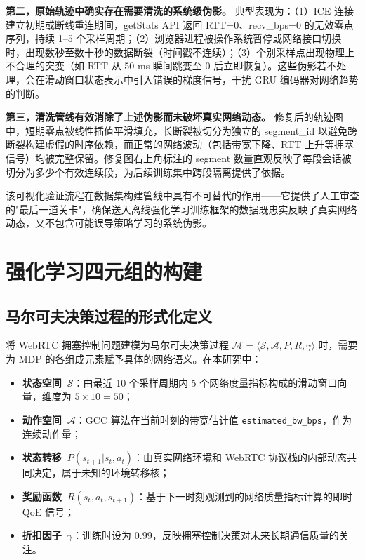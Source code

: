 \textbf{第二，原始轨迹中确实存在需要清洗的系统级伪影。} 典型表现为：（1）ICE 连接建立初期或断线重连期间，getStats API 返回 RTT=0、recv\_bps=0 的无效零点序列，持续 1–5 个采样周期；（2）浏览器进程被操作系统暂停或网络接口切换时，出现数秒至数十秒的数据断裂（时间戳不连续）；（3）个别采样点出现物理上不合理的突变（如 RTT 从 50 ms 瞬间跳变至 0 后立即恢复）。这些伪影若不处理，会在滑动窗口状态表示中引入错误的梯度信号，干扰 GRU 编码器对网络趋势的判断。

\textbf{第三，清洗管线有效消除了上述伪影而未破坏真实网络动态。} 修复后的轨迹图中，短期零点被线性插值平滑填充，长断裂被切分为独立的 segment\_id 以避免跨断裂构建虚假的时序依赖，而正常的网络波动（包括带宽下降、RTT 上升等拥塞信号）均被完整保留。修复图右上角标注的 segment 数量直观反映了每段会话被切分为多少个有效连续段，为后续训练集中跨段隔离提供了依据。

该可视化验证流程在数据集构建管线中具有不可替代的作用——它提供了人工审查的"最后一道关卡"，确保送入离线强化学习训练框架的数据既忠实反映了真实网络动态，又不包含可能误导策略学习的系统伪影。

\section{强化学习四元组的构建}

\subsection{马尔可夫决策过程的形式化定义}

将 WebRTC 拥塞控制问题建模为马尔可夫决策过程 $\mathcal{M} = \langle \mathcal{S}, \mathcal{A}, P, R, \gamma \rangle$ 时，需要为 MDP 的各组成元素赋予具体的网络语义。在本研究中：

\begin{itemize}
    \item \textbf{状态空间~$\mathcal{S}$}：由最近 10 个采样周期内 5 个网络度量指标构成的滑动窗口向量，维度为 $5 \times 10 = 50$；
    \item \textbf{动作空间~$\mathcal{A}$}：GCC 算法在当前时刻的带宽估计值 \texttt{estimated\_bw\_bps}，作为连续动作量；
    \item \textbf{状态转移~$P(s_{t+1}|s_t, a_t)$}：由真实网络环境和 WebRTC 协议栈的内部动态共同决定，属于未知的环境转移核；
    \item \textbf{奖励函数~$R(s_t, a_t, s_{t+1})$}：基于下一时刻观测到的网络质量指标计算的即时 QoE 信号；
    \item \textbf{折扣因子~$\gamma$}：训练时设为 0.99，反映拥塞控制决策对未来长期通信质量的关注。
\end{itemize}

